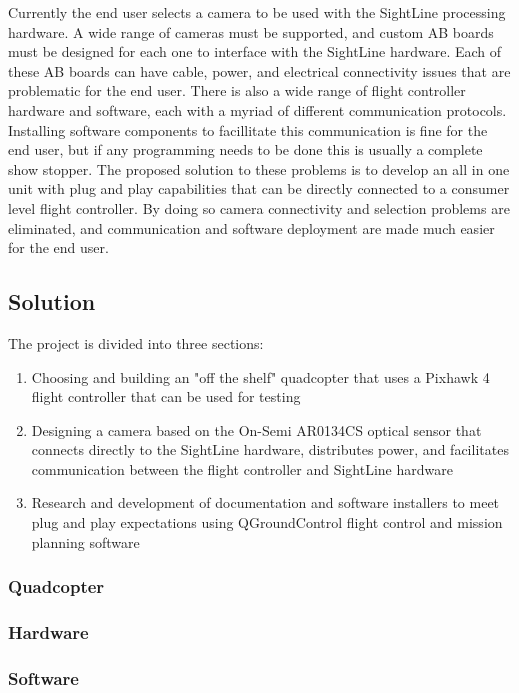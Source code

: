\documentclass[11pt]{article}
\begin{document}
Currently the end user selects a camera to be used with the SightLine processing hardware. A wide range of cameras must be supported, and custom AB boards must be designed for each one to interface with the SightLine hardware. Each of these AB boards can have cable, power, and electrical connectivity issues that are problematic for the end user.
There is also a wide range of flight controller hardware and software, each with a myriad of different communication protocols. Installing software components to facillitate this communication is fine for the end user, but if any programming needs to be done this is usually a complete show stopper. The proposed solution to these problems is to develop an all in one unit with plug and play capabilities that can be directly connected to a consumer level flight controller. By doing so camera connectivity and selection problems are eliminated, and communication and software deployment are made much easier for the end user.

\subsection{Solution}

The project is divided into three sections:
\begin{enumerate}
 \item Choosing and building an "off the shelf" quadcopter that uses a Pixhawk 4 flight controller that can be used for testing
 \item Designing a camera based on the On-Semi AR0134CS optical sensor that connects directly to the SightLine hardware, distributes power, and facilitates communication  between the flight controller and SightLine hardware
 \item Research and development of documentation and software installers to meet plug and play expectations using QGroundControl flight control and mission planning software
\end{enumerate}


\subsubsection{Quadcopter}
\subsubsection{Hardware}
\subsubsection{Software}
\end{document}
